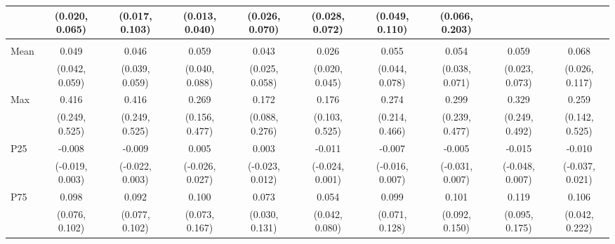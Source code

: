 {\begin{tabular}{l|c|c|c|c|c|c|c|c|c}
& {\scriptsize (0.020, 0.065)}
& {\scriptsize (0.017, 0.103)}
& {\scriptsize (0.013, 0.040)}
& {\scriptsize (0.026, 0.070)}
& {\scriptsize (0.028, 0.072)}
& {\scriptsize (0.049, 0.110)}
& {\scriptsize (0.066, 0.203)}
\\ [0.1cm]
\hline
\noalign{\smallskip}
\multicolumn{10}{l}{\textbf{Effect with Leads and Lags}} \\
\noalign{\smallskip}
\hline
Mean
& 0.049 & 0.046 & 0.059 & 0.043 & 0.026 & 0.055 & 0.054 & 0.059 & 0.068 \\
& {\scriptsize (0.042, 0.059)}
& {\scriptsize (0.039, 0.059)}
& {\scriptsize (0.040, 0.088)}
& {\scriptsize (0.025, 0.058)}
& {\scriptsize (0.020, 0.045)}
& {\scriptsize (0.044, 0.078)}
& {\scriptsize (0.038, 0.071)}
& {\scriptsize (0.023, 0.073)}
& {\scriptsize (0.026, 0.117)}
\\ [0.1cm]
\hline
Max
& 0.416 & 0.416 & 0.269 & 0.172 & 0.176 & 0.274 & 0.299 & 0.329 & 0.259 \\
& {\scriptsize (0.249, 0.525)}
& {\scriptsize (0.249, 0.525)}
& {\scriptsize (0.156, 0.477)}
& {\scriptsize (0.088, 0.276)}
& {\scriptsize (0.103, 0.525)}
& {\scriptsize (0.214, 0.466)}
& {\scriptsize (0.239, 0.477)}
& {\scriptsize (0.249, 0.492)}
& {\scriptsize (0.142, 0.525)}
\\ [0.1cm]
\hline
P25
& -0.008 & -0.009 & 0.005 & 0.003 & -0.011 & -0.007 & -0.005 & -0.015 & -0.010 \\
& {\scriptsize (-0.019, 0.003)}
& {\scriptsize (-0.022, 0.003)}
& {\scriptsize (-0.026, 0.027)}
& {\scriptsize (-0.023, 0.012)}
& {\scriptsize (-0.024, 0.001)}
& {\scriptsize (-0.016, 0.007)}
& {\scriptsize (-0.031, 0.007)}
& {\scriptsize (-0.048, 0.007)}
& {\scriptsize (-0.037, 0.021)}
\\ [0.1cm]
\hline
P75
& 0.098 & 0.092 & 0.100 & 0.073 & 0.054 & 0.099 & 0.101 & 0.119 & 0.106 \\
& {\scriptsize (0.076, 0.102)}
& {\scriptsize (0.077, 0.102)}
& {\scriptsize (0.073, 0.167)}
& {\scriptsize (0.030, 0.131)}
& {\scriptsize (0.042, 0.080)}
& {\scriptsize (0.071, 0.128)}
& {\scriptsize (0.092, 0.150)}
& {\scriptsize (0.095, 0.175)}
& {\scriptsize (0.042, 0.222)}
\\ [0.1cm]
\hline
\hline
\end{tabular}
}
